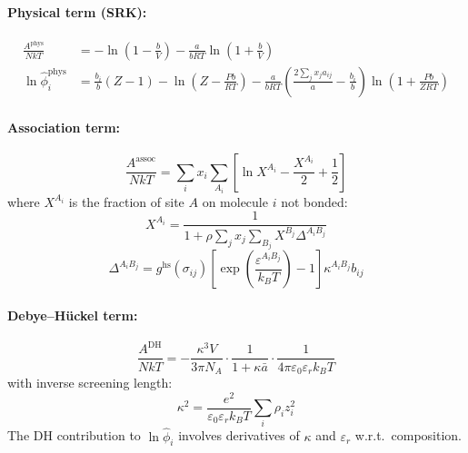 \documentclass[11pt]{article}
\begin{document}
\paragraph{Physical term (SRK):}
\begin{align}
  \frac{A^\mathrm{phys}}{NkT} &= -\ln\!\left(1 - \frac{b}{V}\right)
    - \frac{a}{bRT}\ln\!\left(1 + \frac{b}{V}\right) \\
  \ln\hat{\phi}_i^\mathrm{phys} &= \frac{b_i}{b}(Z-1) - \ln\!\left(Z - \frac{Pb}{RT}\right)
    - \frac{a}{bRT}\left(\frac{2\sum_j x_j a_{ij}}{a} - \frac{b_i}{b}\right)
    \ln\!\left(1 + \frac{Pb}{ZRT}\right)
\end{align}

\paragraph{Association term:}
\begin{equation}
  \frac{A^\mathrm{assoc}}{NkT} = \sum_i x_i \sum_{A_i}
    \left[\ln X^{A_i} - \frac{X^{A_i}}{2} + \frac{1}{2}\right]
\end{equation}
where $X^{A_i}$ is the fraction of site $A$ on molecule $i$ not bonded:
\begin{equation}
  X^{A_i} = \frac{1}{1 + \rho \sum_j x_j \sum_{B_j} X^{B_j} \Delta^{A_i B_j}}
\end{equation}
\begin{equation}
  \Delta^{A_i B_j} = g^\mathrm{hs}(\sigma_{ij}) \left[\exp\!\left(\frac{\varepsilon^{A_i B_j}}{k_B T}\right) - 1\right]
    \kappa^{A_i B_j} b_{ij}
\end{equation}

\paragraph{Debye--Hückel term:}
\begin{equation}
  \frac{A^\mathrm{DH}}{NkT} = -\frac{\kappa^3 V}{3\pi N_A}
  \cdot \frac{1}{1 + \kappa \bar{a}}
  \cdot \frac{1}{4\pi\varepsilon_0 \varepsilon_r k_B T}
\end{equation}
with inverse screening length:
\begin{equation}
  \kappa^2 = \frac{e^2}{\varepsilon_0 \varepsilon_r k_B T} \sum_i \rho_i z_i^2
\end{equation}
The DH contribution to $\ln\hat{\phi}_i$ involves derivatives of $\kappa$ and $\varepsilon_r$ w.r.t.\ composition.
\end{document}
